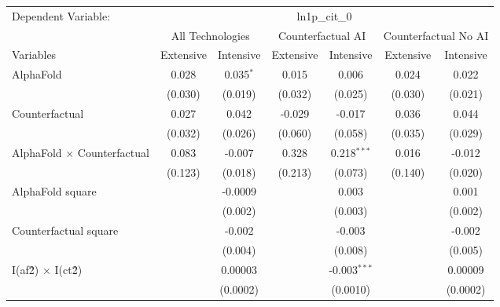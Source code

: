 \begingroup
\centering
\begin{tabular}{lcccccc}
   \tabularnewline \midrule \midrule
   Dependent Variable: & \multicolumn{6}{c}{ln1p\_cit\_0}\\
 & \multicolumn{2}{c}{All Technologies} & \multicolumn{2}{c}{Counterfactual AI} & \multicolumn{2}{c}{Counterfactual No AI} \\
\cmidrule(lr){1-1}\cmidrule(lr){2-3} \cmidrule(lr){4-5} \cmidrule(lr){6-7}
Variables & \multicolumn{1}{c}{Extensive} & \multicolumn{1}{c}{Intensive} & \multicolumn{1}{c}{Extensive} & \multicolumn{1}{c}{Intensive} & \multicolumn{1}{c}{Extensive} & \multicolumn{1}{c}{Intensive} \\
\cmidrule(lr){1-1}\cmidrule(lr){2-2} \cmidrule(lr){3-3} \cmidrule(lr){4-4} \cmidrule(lr){5-5} \cmidrule(lr){6-6} \cmidrule(lr){7-7}
   AlphaFold                          & 0.028   & 0.035$^{*}$ & 0.015   & 0.006          & 0.024   & 0.022\\   
                                      & (0.030) & (0.019)     & (0.032) & (0.025)        & (0.030) & (0.021)\\   
   Counterfactual                     & 0.027   & 0.042       & -0.029  & -0.017         & 0.036   & 0.044\\   
                                      & (0.032) & (0.026)     & (0.060) & (0.058)        & (0.035) & (0.029)\\   
   AlphaFold $\times$ Counterfactual  & 0.083   & -0.007      & 0.328   & 0.218$^{***}$  & 0.016   & -0.012\\   
                                      & (0.123) & (0.018)     & (0.213) & (0.073)        & (0.140) & (0.020)\\   
   AlphaFold square                   &         & -0.0009     &         & 0.003          &         & 0.001\\   
                                      &         & (0.002)     &         & (0.003)        &         & (0.002)\\   
   Counterfactual square              &         & -0.002      &         & -0.003         &         & -0.002\\   
                                      &         & (0.004)     &         & (0.008)        &         & (0.005)\\   
   I(af\^2) $\times$ I(ct\^2)         &         & 0.00003     &         & -0.003$^{***}$ &         & 0.00009\\   
                                      &         & (0.0002)    &         & (0.0010)       &         & (0.0002)\\   

\end{tabular}
